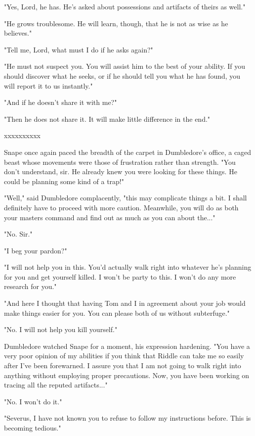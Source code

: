 \documentclass[a4paper,11pt]{article}
\begin{document}
"Yes, Lord, he has. He's asked about possessions and artifacts of theirs as well."

"He grows troublesome. He will learn, though, that he is not as wise as he believes."

"Tell me, Lord, what must I do if he asks again?"

"He must not suspect you. You will assist him to the best of your ability. If you should discover what he seeks, or if he should tell you what he has found, you will report it to us instantly."

"And if he doesn't share it with me?"

"Then he does not share it. It will make little difference in the end."

xxxxxxxxxx

Snape once again paced the breadth of the carpet in Dumbledore's office, a caged beast whose movements were those of frustration rather than strength. "You don't understand, sir. He already knew you were looking for these things. He could be planning some kind of a trap!"

"Well," said Dumbledore complacently, "this may complicate things a bit. I shall definitely have to proceed with more caution. Meanwhile, you will do as both your masters command and find out as much as you can about the..."

"No. Sir."

"I beg your pardon?"

"I will not help you in this. You'd actually walk right into whatever he's planning for you and get yourself killed. I won't be party to this. I won't do any more research for you."

"And here I thought that having Tom and I in agreement about your job would make things easier for you. You can please both of us without subterfuge."

"No. I will not help you kill yourself."

Dumbledore watched Snape for a moment, his expression hardening. "You have a very poor opinion of my abilities if you think that Riddle can take me so easily after I've been forewarned. I assure you that I am not going to walk right into anything without employing proper precautions. Now, you have been working on tracing all the reputed artifacts..."

"No. I won't do it."

"Severus, I have not known you to refuse to follow my instructions before. This is becoming tedious."
\end{document}

